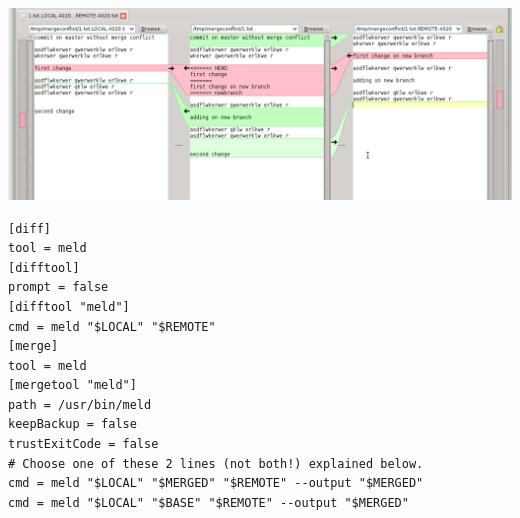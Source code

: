 \documentclass[paper=8.5in:11in, twoside, 12pt, pagesize=pdftex]{book}
\begin{document}
\begin{center}
	\includegraphics[scale=0.4]{pics/merge.png}
\end{center}

\begin{lstlisting}
[diff]
tool = meld
[difftool]
prompt = false
[difftool "meld"]
cmd = meld "$LOCAL" "$REMOTE"
[merge]
tool = meld
[mergetool "meld"]
path = /usr/bin/meld
keepBackup = false
trustExitCode = false	
# Choose one of these 2 lines (not both!) explained below.
cmd = meld "$LOCAL" "$MERGED" "$REMOTE" --output "$MERGED"
cmd = meld "$LOCAL" "$BASE" "$REMOTE" --output "$MERGED"	
\end{lstlisting}
	
\end{document}
